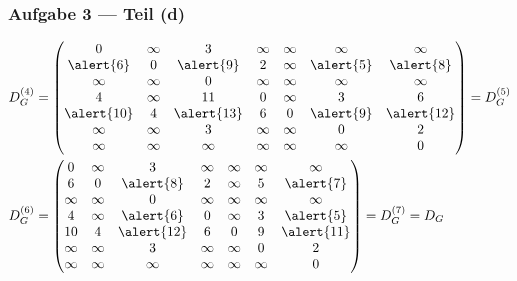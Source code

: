 \documentclass{beamer}
\begin{document}
\begin{frame} \frametitle{Aufgabe 3 --- Teil (d)}
	\small
	\begin{equation*}
	\begin{aligned}
		D_G^{(4)} &= \begin{pmatrix}
		0      & \infty & 3      & \infty & \infty & \infty & \infty \\
		\alert{6}      & 0      & \alert{9}     & 2      & \infty & \alert{5} & \alert{8} \\
		\infty & \infty & 0      & \infty & \infty & \infty & \infty \\
		4      & \infty & 11     & 0      & \infty & 3      & 6      \\
		\alert{10}     & 4      & \alert{13}     & 6      & 0      & \alert{9} & \alert{12}     \\
		\infty & \infty & 3      & \infty & \infty & 0      & 2      \\
		\infty & \infty & \infty & \infty & \infty & \infty & 0
		\end{pmatrix}
		= D_G^{(5)} \\
		D_G^{(6)} &= \begin{pmatrix}
		0          & \infty & 3          & \infty & \infty & \infty & \infty \\
		6          & 0      & \alert{8}  & 2      & \infty & 5      & \alert{7} \\
		\infty     & \infty & 0          & \infty & \infty & \infty & \infty \\
		4          & \infty & \alert{6}  & 0      & \infty & 3      & \alert{5}     \\
		10         & 4      & \alert{12} & 6      & 0      & 9      & \alert{11}     \\
		\infty     & \infty & 3          & \infty & \infty & 0      & 2      \\
		\infty     & \infty & \infty     & \infty & \infty & \infty & 0
		\end{pmatrix}
		= D_G^{(7)} = D_G
	\end{aligned}
	\end{equation*}
\end{frame}
\end{document}
